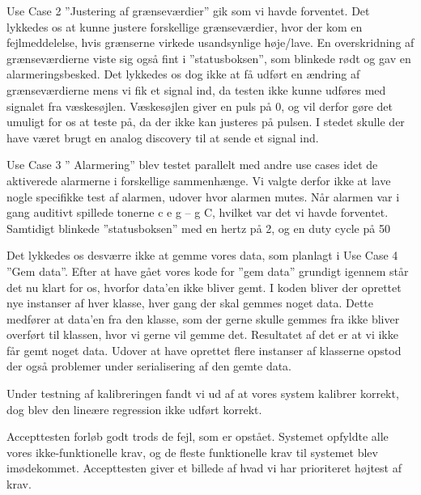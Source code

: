 Use Case 2 ”Justering af grænseværdier” gik som vi havde forventet. Det lykkedes os at kunne justere forskellige grænseværdier, hvor der kom en fejlmeddelelse, hvis grænserne virkede usandsynlige høje/lave.  En overskridning af grænseværdierne viste sig også fint i ”statusboksen”, som blinkede rødt og gav en alarmeringsbesked. Det lykkedes os dog ikke at få udført en ændring af grænseværdierne mens vi fik et signal ind, da testen ikke kunne udføres med signalet fra væskesøjlen. Væskesøjlen giver en puls på 0, og vil derfor gøre det umuligt for os at teste på, da der ikke kan justeres på pulsen. I stedet skulle der have været brugt en analog discovery til at sende et signal ind.

Use Case 3 ” Alarmering” blev testet parallelt med andre use cases idet de aktiverede alarmerne i forskellige sammenhænge. Vi valgte derfor ikke at lave nogle specifikke test af alarmen, udover hvor alarmen mutes. Når alarmen var i gang auditivt spillede tonerne c e g – g C, hvilket var det vi havde forventet. Samtidigt blinkede ”statusboksen” med en hertz på 2, og en duty cycle på 50%

Det lykkedes os desværre ikke at gemme vores data, som planlagt i Use Case 4 ”Gem data”. Efter at have gået vores kode for ”gem data” grundigt igennem står det nu klart for os, hvorfor data’en ikke bliver gemt. I koden bliver der oprettet nye instanser af hver klasse, hver gang der skal gemmes noget data. Dette medfører at data’en fra den klasse, som der gerne skulle gemmes fra ikke bliver overført til klassen, hvor vi gerne vil gemme det. Resultatet af det er at vi ikke får gemt noget data.
Udover at have oprettet flere instanser af klasserne opstod der også problemer under serialisering af den gemte data. 

Under testning af kalibreringen fandt vi ud af at vores system kalibrer korrekt, dog blev den lineære regression ikke udført korrekt.

Accepttesten forløb godt trods de fejl, som er opstået. Systemet opfyldte alle vores ikke-funktionelle krav, og de fleste funktionelle krav til systemet blev imødekommet. Accepttesten giver et billede af hvad vi har prioriteret højtest af krav.
